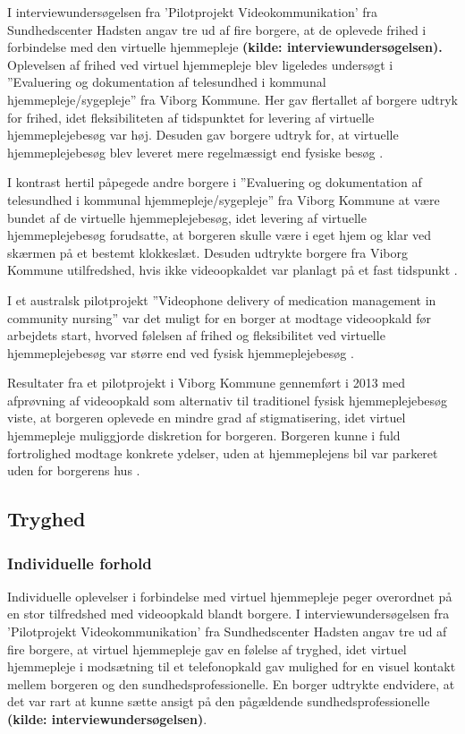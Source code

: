 I interviewundersøgelsen fra ’Pilotprojekt Videokommunikation’ fra Sundhedscenter Hadsten angav tre ud af fire borgere, at de oplevede frihed i forbindelse med den virtuelle hjemmepleje \textbf{(kilde: interviewundersøgelsen). 
} 
Oplevelsen af frihed ved virtuel hjemmepleje blev ligeledes undersøgt i ”Evaluering og dokumentation af telesundhed i kommunal hjemmepleje/sygepleje” fra Viborg Kommune. Her gav flertallet af borgere udtryk for frihed, idet fleksibiliteten af tidspunktet for levering af virtuelle hjemmeplejebesøg var høj. Desuden gav borgere udtryk for, at virtuelle hjemmeplejebesøg blev leveret mere regelmæssigt end fysiske besøg \cite{kandidat}.
 
I kontrast hertil påpegede andre borgere i ”Evaluering og dokumentation af telesundhed i kommunal hjemmepleje/sygepleje” fra Viborg Kommune at være bundet af de virtuelle hjemmeplejebesøg, idet levering af virtuelle hjemmeplejebesøg forudsatte, at borgeren skulle være i eget hjem og klar ved skærmen på et bestemt klokkeslæt. Desuden udtrykte borgere fra Viborg Kommune utilfredshed, hvis ikke videoopkaldet var planlagt på et fast tidspunkt \cite{kandidat}.
 
I et australsk pilotprojekt ”Videophone delivery of medication management in community nursing” var det muligt for en borger at modtage videoopkald før arbejdets start, hvorved følelsen af frihed og fleksibilitet ved virtuelle hjemmeplejebesøg var større end ved fysisk hjemmeplejebesøg \cite{wade}.
 
Resultater fra et pilotprojekt i Viborg Kommune gennemført i 2013 med afprøvning af videoopkald som alternativ til traditionel fysisk hjemmeplejebesøg viste, at borgeren oplevede en mindre grad af stigmatisering, idet virtuel hjemmepleje muliggjorde diskretion for borgeren. Borgeren kunne i fuld fortrolighed modtage konkrete ydelser, uden at hjemmeplejens bil var parkeret uden for borgerens hus \cite{kandidat}.

\subsection{Tryghed}
\subsubsection{Individuelle forhold}
Individuelle oplevelser i forbindelse med virtuel hjemmepleje peger overordnet på en stor tilfredshed med videoopkald blandt borgere. I interviewundersøgelsen fra ’Pilotprojekt Videokommunikation’ fra Sundhedscenter Hadsten angav tre ud af fire borgere, at virtuel hjemmepleje gav en følelse af tryghed, idet virtuel hjemmepleje i modsætning til et telefonopkald gav mulighed for en visuel kontakt mellem borgeren og den sundhedsprofessionelle. En borger udtrykte endvidere, at det var rart at kunne sætte ansigt på den pågældende sundhedsprofessionelle \textbf{(kilde: interviewundersøgelsen)}.

